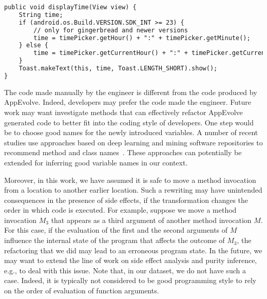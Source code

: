 \vspace{0.2cm}
\begin{lstlisting}[language=diff,numbers=none]
public void displayTime(View view) {
    String time;
    if (android.os.Build.VERSION.SDK_INT >= 23) {
        // only for gingerbread and newer versions
        time = timePicker.getHour() + ":" + timePicker.getMinute();
    } else {
        time = timePicker.getCurrentHour() + ":" + timePicker.getCurrentMinute();
    }
    Toast.makeText(this, time, Toast.LENGTH_SHORT).show();
}
\end{lstlisting}


\vspace{0.5cm}The code made manually by the engineer is different from the code produced
by AppEvolve. Indeed, developers may prefer the code made the
engineer. Future work may want investigate methods that can effectively
refactor AppEvolve generated code to better fit into the coding style of
developers. One step would be to choose good names for the newly introduced
variables. A number of recent studies use approaches based on deep learning
and mining software repositories to recommend method and class
names~\cite{allamanis2015suggesting}. These approaches can potentially be extended for inferring good
variable names in our context.



Moreover, in this work, we have assumed it is safe to move a method
invocation from a location to another earlier location. Such a rewriting
may have unintended consequences in the presence of side effects, if the
transformation changes the order in which code is executed.  For example,
suppose we move a method invocation $M_3$ that appears as a third argument
of another method invocation $M$. For this case, if the evaluation of the
first and the second arguments of $M$ influence the internal state of the
program that affects the outcome of $M_3$, the refactoring that we did may
lead to an erroneous program state. In the future, we may want to extend
the line of work on side effect analysis and purity inference, e.g., to
deal with this issue. Note that, in our dataset, we do not have such a
case.  Indeed, it is typically not considered to be good programming style
to rely on the order of evaluation of function arguments.





